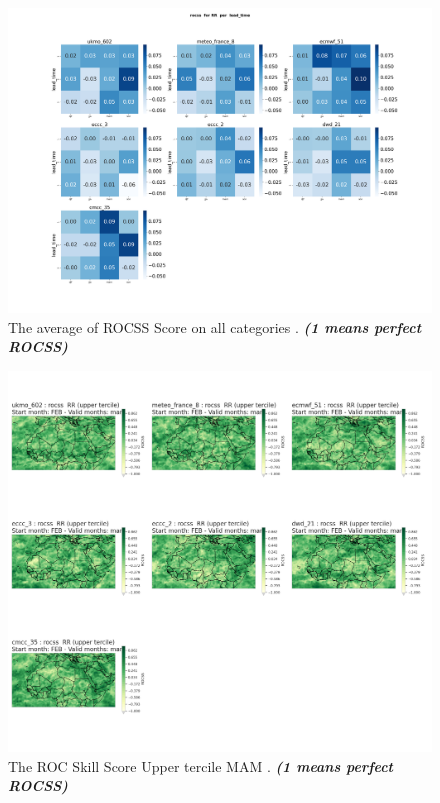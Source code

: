 \begin{figure}[H]
    \centering
    \includegraphics[scale=0.25]{plots/prob/rocss/rocss_RR_lead_time.png}
    \caption{The average of  ROCSS Score on all categories    . \textbf{\textit{(1 means perfect ROCSS)}}}
\end{figure}



\begin{figure}[H]
    \centering
    \includegraphics[scale=0.3]{plots/prob/rocss/rocss_mam_RR_upper.png}
    \caption{The ROC Skill Score Upper tercile MAM    . \textbf{\textit{(1 means perfect ROCSS)}}}
\end{figure}

